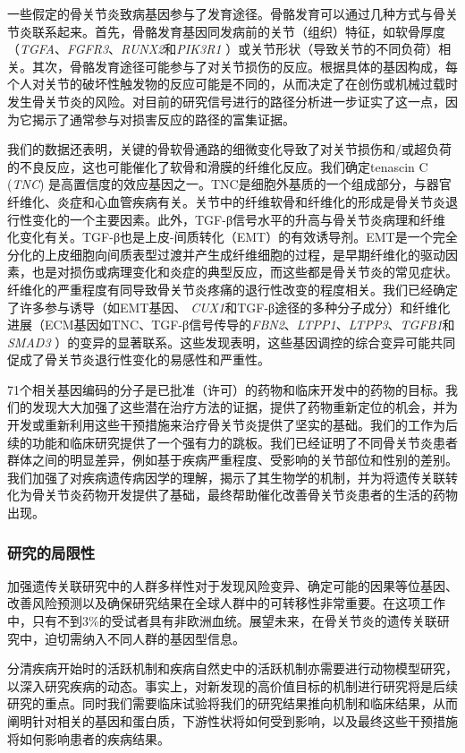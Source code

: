 一些假定的骨关节炎致病基因参与了发育途径。骨骼发育可以通过几种方式与骨关节炎联系起来。首先，骨骼发育基因同发病前的关节（组织）特征，如软骨厚度（\emph{TGFA}、\emph{FGFR3}、\emph{RUNX2}和\emph{PIK3R1}
）或关节形状（导致关节的不同负荷）相关。其次，骨骼发育途径可能参与了对关节损伤的反应。根据具体的基因构成，每个人对关节的破坏性触发物的反应可能是不同的，从而决定了在创伤或机械过载时发生骨关节炎的风险。对目前的研究信号进行的路径分析进一步证实了这一点，因为它揭示了通常参与对损害反应的路径的富集证据。

我们的数据还表明，关键的骨软骨通路的细微变化导致了对关节损伤和/或超负荷的不良反应，这也可能催化了软骨和滑膜的纤维化反应。我们确定tenascin
C (\emph{TNC})
是高置信度的效应基因之一。TNC是细胞外基质的一个组成部分，与器官纤维化、炎症和心血管疾病有关。关节中的纤维软骨和纤维化的形成是骨关节炎退行性变化的一个主要因素。此外，TGF-β信号水平的升高与骨关节炎病理和纤维化变化有关。TGF-β也是上皮-间质转化（EMT）的有效诱导剂。EMT是一个完全分化的上皮细胞向间质表型过渡并产生成纤维细胞的过程，是早期纤维化的驱动因素，也是对损伤或病理变化和炎症的典型反应，而这些都是骨关节炎的常见症状。纤维化的严重程度有同导致骨关节炎疼痛的退行性改变的程度相关。我们已经确定了许多参与诱导（如EMT基因、\emph{
CUX1}和TGF-β途径的多种分子成分）和纤维化进展（ECM基因如TNC、TGF-β信号传导的\emph{FBN2}、\emph{LTPP1}、\emph{LTPP3}、\emph{TGFB1}和\emph{SMAD3}
）的变异的显著联系。这些发现表明，这些基因调控的综合变异可能共同促成了骨关节炎退行性变化的易感性和严重性。

71个相关基因编码的分子是已批准（许可）的药物和临床开发中的药物的目标。我们的发现大大加强了这些潜在治疗方法的证据，提供了药物重新定位的机会，并为开发或重新利用这些干预措施来治疗骨关节炎提供了坚实的基础。我们的工作为后续的功能和临床研究提供了一个强有力的跳板。我们已经证明了不同骨关节炎患者群体之间的明显差异，例如基于疾病严重程度、受影响的关节部位和性别的差别。我们加强了对疾病遗传病因学的理解，揭示了其生物学的机制，并为将遗传关联转化为骨关节炎药物开发提供了基础，最终帮助催化改善骨关节炎患者的生活的药物出现。

\subsubsection*{研究的局限性}

加强遗传关联研究中的人群多样性对于发现风险变异、确定可能的因果等位基因、改善风险预测以及确保研究结果在全球人群中的可转移性非常重要。在这项工作中，只有不到3\%的受试者具有非欧洲血统。展望未来，在骨关节炎的遗传关联研究中，迫切需纳入不同人群的基因型信息。

分清疾病开始时的活跃机制和疾病自然史中的活跃机制亦需要进行动物模型研究，以深入研究疾病的动态。事实上，对新发现的高价值目标的机制进行研究将是后续研究的重点。同时我们需要临床试验将我们的研究结果推向机制和临床结果，从而阐明针对相关的基因和蛋白质，下游性状将如何受到影响，以及最终这些干预措施将如何影响患者的疾病结果。
